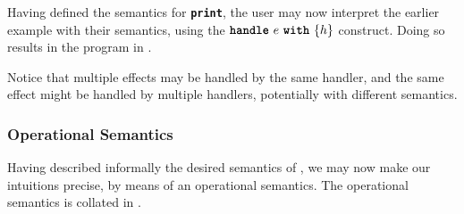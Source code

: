 

% 
Having defined the semantics for \textbf{\texttt{print}}, the user may now interpret the earlier example with their semantics, using the $\textbf{\texttt{handle}} \,\, {e} \,\, \textbf{\texttt{with}} \,\, \{{h}\}$ construct. Doing so results in the program in .

Notice that multiple effects may be handled by the same handler, and the same effect might be handled by multiple handlers, potentially with different semantics. 

\subsubsection{Operational Semantics}
Having described informally the desired semantics of \efflang{}, we may now make our intuitions precise, by means of an operational semantics. The operational semantics is collated in . 

